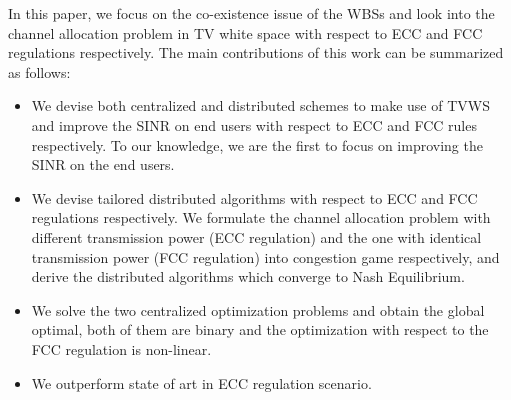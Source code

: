 \documentclass[times]{ettauth}
\theoremstyle{mytheoremstyle}
\theoremstyle{mytheoremstyle}
\theoremstyle{mytheoremstyle}
\begin{document}
In this paper, we focus on the co-existence issue of the WBSs and look into the channel allocation problem in TV white space with respect to ECC and FCC regulations respectively.
The main contributions of this work can be summarized as follows:
\begin{itemize} 
\item We devise both centralized and distributed schemes to make use of TVWS and improve the SINR on end users with respect to ECC and FCC rules respectively. To our knowledge, we are the first to focus on improving the SINR on the end users. 
\item We devise tailored distributed algorithms with respect to ECC and FCC regulations respectively. 
We formulate the channel allocation problem with different transmission power (ECC regulation) and the one with identical transmission power (FCC regulation) into congestion game respectively, and derive the distributed algorithms which converge to Nash Equilibrium. 
\item We solve the two centralized optimization problems and obtain the global optimal, both of them are binary and the optimization with respect to the FCC regulation is non-linear.
\item We outperform state of art in ECC regulation scenario.

\end{itemize}
\end{document}
